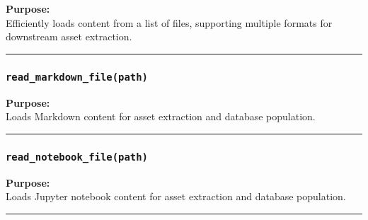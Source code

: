 \textbf{Purpose:}\\
Efficiently loads content from a list of files, supporting multiple
formats for downstream asset extraction.

\begin{center}\rule{0.5\linewidth}{0.5pt}\end{center}

\subsubsection{\texorpdfstring{\texttt{read\_markdown\_file(path)}}{read\_markdown\_file(path)}}\label{read_markdown_filepath}

\begin{Shaded}
\begin{Highlighting}[]
\end{Highlighting}
\end{Shaded}

\textbf{Purpose:}\\
Loads Markdown content for asset extraction and database population.

\begin{center}\rule{0.5\linewidth}{0.5pt}\end{center}

\subsubsection{\texorpdfstring{\texttt{read\_notebook\_file(path)}}{read\_notebook\_file(path)}}\label{read_notebook_filepath}

\begin{Shaded}
\begin{Highlighting}[]
\end{Highlighting}
\end{Shaded}

\textbf{Purpose:}\\
Loads Jupyter notebook content for asset extraction and database
population.

\begin{center}\rule{0.5\linewidth}{0.5pt}\end{center}

